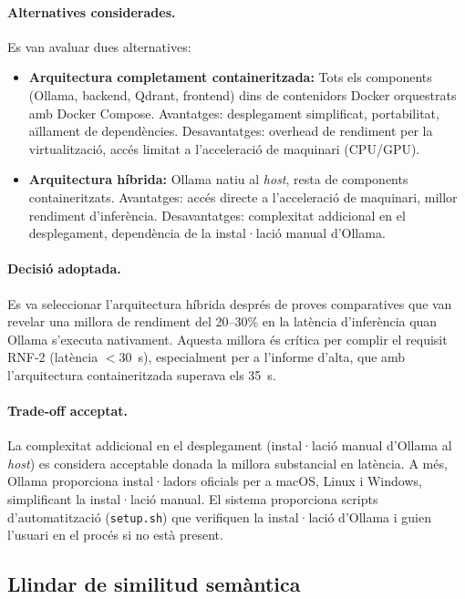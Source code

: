 \documentclass[CAT]{TFUOC}%
\begin{document}
\paragraph{Alternatives considerades.}
Es van avaluar dues alternatives:

\begin{itemize}
    \item \textbf{Arquitectura completament containeritzada:} Tots els components (Ollama, backend, Qdrant, frontend) dins de contenidors Docker orquestrats amb Docker Compose. Avantatges: desplegament simplificat, portabilitat, aïllament de dependències. Desavantatges: overhead de rendiment per la virtualització, accés limitat a l'acceleració de maquinari (CPU/GPU).
    
    \item \textbf{Arquitectura híbrida:} Ollama natiu al \textit{host}, resta de components containeritzats. Avantatges: accés directe a l'acceleració de maquinari, millor rendiment d'inferència. Desavantatges: complexitat addicional en el desplegament, dependència de la instal·lació manual d'Ollama.
\end{itemize}

\paragraph{Decisió adoptada.}
Es va seleccionar l'arquitectura híbrida després de proves comparatives que van revelar una millora de rendiment del 20--30\% en la latència d'inferència quan Ollama s'executa nativament. Aquesta millora és crítica per complir el requisit RNF-2 (latència $<$30~s), especialment per a l'informe d'alta, que amb l'arquitectura containeritzada superava els 35~s.

\paragraph{Trade-off acceptat.}
La complexitat addicional en el desplegament (instal·lació manual d'Ollama al \textit{host}) es considera acceptable donada la millora substancial en latència. A més, Ollama proporciona instal·ladors oficials per a macOS, Linux i Windows, simplificant la instal·lació manual. El sistema proporciona scripts d'automatització (\texttt{setup.sh}) que verifiquen la instal·lació d'Ollama i guien l'usuari en el procés si no està present.

\subsection{Llindar de similitud semàntica}
\end{document}
